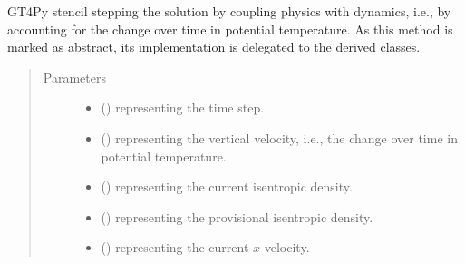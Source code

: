\documentclass[letterpaper,10pt,english]{sphinxmanual}
\begin{document}
\begin{fulllineitems}
\begin{fulllineitems}
\end{fulllineitems}


\begin{fulllineitems}
\label{\detokenize{api:tasmania.dycore.prognostic_isentropic_nonconservative.PrognosticIsentropicNonconservative._stencil_stepping_by_coupling_physics_with_dynamics_defs}}
GT4Py stencil stepping the solution by coupling physics with dynamics, i.e., by accounting for the
change over time in potential temperature.
As this method is marked as abstract, its implementation is delegated to the derived classes.
\begin{quote}\begin{description}
\item[{Parameters}] \leavevmode\begin{itemize}
\item {} 
 () \textendash{}  representing the time step.

\item {} 
 () \textendash{}  representing the vertical velocity, i.e., the change over time in potential temperature.

\item {} 
 () \textendash{}  representing the current isentropic density.

\item {} 
 () \textendash{}  representing the provisional isentropic density.

\item {} 
 () \textendash{}  representing the current \(x\)-velocity.


\end{itemize}
\end{description}
\end{quote}
\end{fulllineitems}
\end{fulllineitems}
\end{document}
